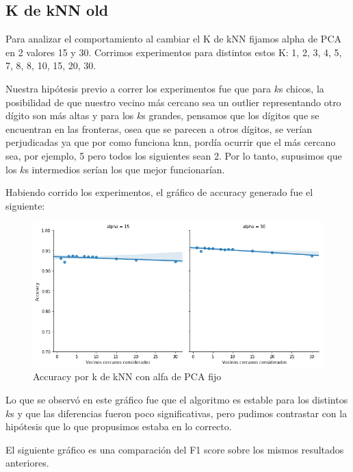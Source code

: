 \subsection{K de kNN old}

Para analizar el comportamiento al cambiar el K de kNN fijamos alpha de PCA en 2 valores 15 y 30. Corrimos experimentos para distintos estos K: 1, 2, 3, 4, 5, 7, 8, 8, 10, 15, 20, 30.

Nuestra hipótesis previo a correr los experimentos fue que para $k$s chicos, la posibilidad de que nuestro vecino más cercano sea un outlier representando otro dígito son más altas y para los $k$s grandes, pensamos que los dígitos que se encuentran en las fronteras, osea que se parecen a otros dígitos, se verían perjudicadas ya que por como funciona knn, pordía ocurrir que el más cercano sea, por ejemplo, 5 pero todos los siguientes sean 2. Por lo tanto, supusimos que los $k$s intermedios serían los que mejor funcionarían.

Habiendo corrido los experimentos, el gráfico de accuracy generado fue el siguiente:

\begin{figure}[H]
    \begin{center}
      \includegraphics[width=0.8\columnwidth]{imagenes/Accuracy_15_30.png}
      \caption{Accuracy por k de kNN con alfa de PCA fijo}
    \end{center}
\end{figure}

Lo que se observó en este gráfico fue que el algoritmo es estable para los distintos $k$s y que las diferencias fueron poco significativas, pero pudimos contrastar con la hipótesis que lo que propusimos estaba en lo correcto.

El siguiente gráfico es una comparación del F1 score sobre los mismos resultados anteriores.

